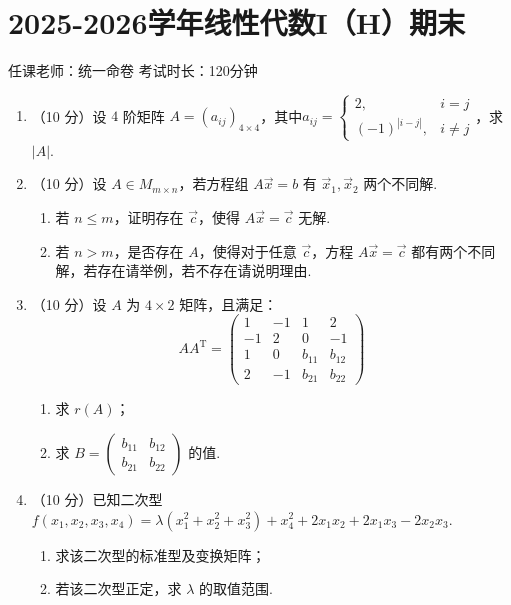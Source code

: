 \section{2025-2026学年线性代数I（H）期末}

\begin{center}
    任课老师：统一命卷\hspace{4em} 考试时长：120分钟
\end{center}

\begin{enumerate}
    \item （10 分）设 $4$ 阶矩阵 $A = (a_{ij})_{4 \times 4}$，其中$a_{ij}=\begin{cases}
        2, & i=j \\
        (-1)^{|i-j|}, & i \neq j
    \end{cases}$，求 $|A|$.

    \item （10 分）设 $A \in M_{m \times n}$，若方程组 $A\vec{x}=b$ 有 $\vec{x}_1, \vec{x}_2$ 两个不同解.
    \begin{enumerate}
        \item 若 $n \leqslant m$，证明存在 $\vec{c}$，使得 $A\vec{x}=\vec{c}$ 无解.
        \item 若 $n > m$，是否存在 $A$，使得对于任意 $\vec{c}$，方程 $A\vec{x}=\vec{c}$ 都有两个不同解，若存在请举例，若不存在请说明理由.
    \end{enumerate}

    \item （10 分）设 $A$ 为 $4 \times 2$ 矩阵，且满足：
    \[
    AA^\mathrm{T} = \begin{pmatrix}
    1 & -1 & 1 & 2 \\
    -1 & 2 & 0 & -1 \\
    1 & 0 & b_{11} & b_{12} \\
    2 & -1 & b_{21} & b_{22}
    \end{pmatrix}
    \]
    \begin{enumerate}
        \item 求 $r(A)$；
        \item 求 $B = \begin{pmatrix} b_{11} & b_{12} \\ b_{21} & b_{22} \end{pmatrix}$ 的值.
    \end{enumerate}

    \item （10 分）已知二次型 $f(x_1, x_2, x_3, x_4) = \lambda(x_1^2 + x_2^2 + x_3^2) + x_4^2 + 2x_1x_2 + 2x_1x_3 - 2x_2x_3$.
    \begin{enumerate}
        \item 求该二次型的标准型及变换矩阵；
        \item 若该二次型正定，求 $\lambda$ 的取值范围.
    \end{enumerate}


\end{enumerate}
